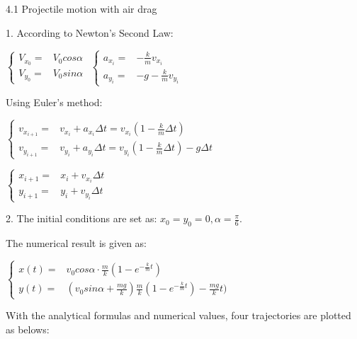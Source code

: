 \documentclass{book}
\begin{document}
{\huge 4.1 Projectile motion with air drag}

{\Large 1.}
\vspace{0.01\textheight}
According to Newton's Second Law:

$\begin{cases}
    V_{x_{0}}= & V_{0}cos\alpha \\

    V_{y_{0}}= & V_{0}sin\alpha
  \end{cases}$
\quad $
  \begin{cases}
    a_{x_{i}}= & -\frac{k}{m}v_{x_{i}}   \\

    a_{y_{i}}= & -g-\frac{k}{m}v_{y_{i}}
  \end{cases}
$

\vspace{0.03\textheight}
Using Euler's method:
\vspace{0.01\textheight}

\quad $
  \begin{cases}
    v_{x_{i+1}}= & v_{x_{i}}+a_{x_{i}}\Delta t = v_{x_{i}}(1-\frac{k}{m}\Delta t)           \\

    v_{y_{i+1}}= & v_{y_{i}}+a_{y_{i}}\Delta t = v_{y_{i}}(1-\frac{k}{m}\Delta t)-g\Delta t
  \end{cases}
$

\vspace{0.01\textheight}

\quad $
  \begin{cases}
    x_{i+1}= & x_{i}+v_{x_{i}}\Delta t \\

    y_{i+1}= & y_{i}+v_{y_{i}}\Delta t
  \end{cases}
$

\vspace{0.01\textheight}
{\Large 2.}
The initial conditions are set as: $x_{0}=y_{0}=0, \alpha =\frac{\pi}{6}$.

\quad The numerical result is given as:

\quad $\begin{cases}
    x(t)= & v_{0}cos\alpha \cdot \frac{m}{k}(1-e^{-\frac{k}{m}t})                          \\
    y(t)= & (v_{0}sin\alpha + \frac{mg}{k})\frac{m}{k}(1-e^{-\frac{k}{m}t})-\frac{mg}{k}t)
  \end{cases}$

With the analytical formulas and numerical values, four trajectories are plotted as belows:
\end{document}
